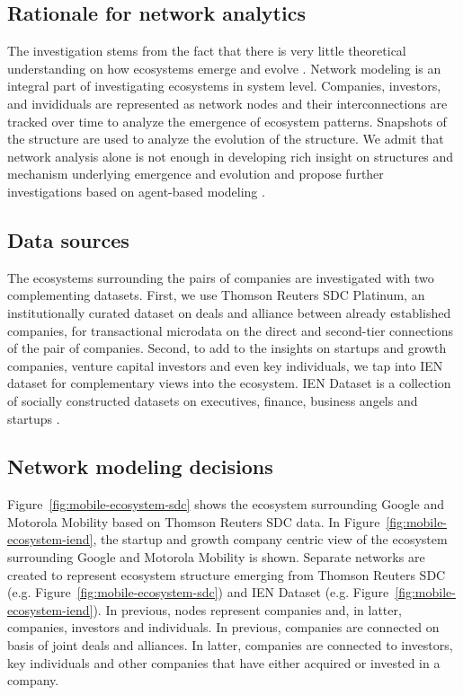 \subsection{Rationale for network analytics}
%
%

The investigation stems from the fact that there is very little theoretical understanding on how ecosystems emerge and evolve \citep{Ahuja2012TheNetworks}. Network modeling is an integral part of investigating ecosystems in system level. Companies, investors, and invididuals are represented as network nodes and their interconnections are tracked over time to analyze the emergence of ecosystem patterns. Snapshots of the structure are used to analyze the evolution of the structure. We admit that network analysis alone is not enough in developing rich insight on structures and mechanism underlying emergence and evolution and propose further investigations based on agent-based modeling \citep[cf.][]{Huotari2016WinnerMarkets}.  

\subsection{Data sources}

The ecosystems surrounding the pairs of companies are investigated with two complementing datasets. First, we use Thomson Reuters SDC Platinum, an institutionally curated dataset on deals and alliance between already established companies, for transactional microdata on the direct and second-tier connections of the pair of companies. Second, to add to the insights on startups and growth companies, venture capital investors and even key individuals, we tap into IEN dataset for complementary views into the ecosystem. IEN Dataset is a collection of socially constructed datasets on executives, finance, business angels and startups \citep{Rubens2010LeveragingMoves}.

\subsection{Network modeling decisions}

Figure~\ref{fig:mobile-ecosystem-sdc} shows the ecosystem surrounding Google and Motorola Mobility based on Thomson Reuters SDC data. In Figure~\ref{fig:mobile-ecosystem-iend}, the startup and growth company centric view of the ecosystem surrounding Google and Motorola Mobility is shown. Separate networks are created to represent ecosystem structure emerging from Thomson Reuters SDC (e.g. Figure~\ref{fig:mobile-ecosystem-sdc}) and IEN Dataset (e.g. Figure~\ref{fig:mobile-ecosystem-iend}). In previous, nodes represent companies and, in latter, companies, investors and individuals. In previous, companies are connected on basis of joint deals and alliances. In latter, companies are connected to investors, key individuals and other companies that have either acquired or invested in a company. 


